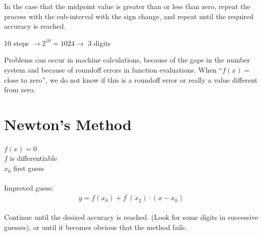\documentclass[a4paper,12pt]{report}
\begin{document}
	In the case that the midpoint value is greater than or less than zero, repeat the process with the sub-interval with the sign change, and
	repeat until the required accuracy is reached.
	
\begin{center}
	10 steps $\longrightarrow 2^{10} = 1024 \longrightarrow$ 3 digits
\end{center}

	Problems can occur in machine calculations, because of the gaps in the number system and because of roundoff errors in function evaluations.
	When ``$f(x)=$ close to zero'', we do not know if this is a roundoff error or really a value different from zero.
	
\pagebreak

\section{Newton's Method}
\begin{multicols}{2}
	\noindent $f(x)=0$\\
	$f$ is differentiable\\
	$x_0$ first guess\\
	\\
	\noindent Improved guess:
	$$ y = f(x_0) + f^\prime (x_2) \cdot (x-x_0) $$\\
	
	\noindent Continue until the desired accuracy is reached. (Look for some digits in successive guesses), or until it becomes obvious that the
	method fails.\\



\end{multicols}
	
\end{document}
